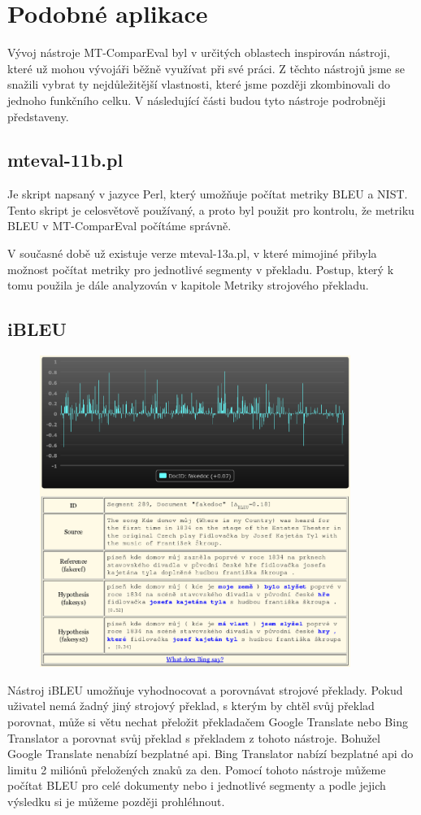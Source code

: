 \section{Podobné aplikace}
Vývoj nástroje MT-ComparEval byl v určitých oblastech inspirován nástroji,
  které už mohou vývojáři běžně využívat při své práci.
Z těchto nástrojů jsme se snažili vybrat ty nejdůležitější vlastnosti,
  které jsme později zkombinovali do jednoho funkčního celku.
V následující části budou tyto nástroje podrobněji představeny.

\subsection{mteval-11b.pl}
Je skript napsaný v jazyce Perl,
  který umožňuje počítat metriky BLEU a NIST.
Tento skript je celosvětově používaný,
  a proto byl použit pro kontrolu,
  že metriku BLEU v MT-ComparEval počítáme správně.

V současné době už existuje verze mteval-13a.pl,
  v které mimojiné přibyla možnost počítat metriky pro jednotlivé segmenty v překladu.
Postup, který k tomu použila je dále analyzován v kapitole Metriky strojového překladu.

\subsection{iBLEU}
\begin{figure}[h]
  \center
  \includegraphics[width=0.9\textwidth]{img/ibleu.eps}
\end{figure}
Nástroj iBLEU umožňuje vyhodnocovat a porovnávat strojové překlady.
Pokud uživatel nemá žadný jiný strojový překlad,
  s kterým by chtěl svůj překlad porovnat,
  může si větu nechat přeložit překladačem Google Translate nebo Bing Translator
  a porovnat svůj překlad s překladem z tohoto nástroje.
Bohužel Google Translate nenabízí bezplatné api.
Bing Translator nabízí bezplatné api do limitu 2 miliónů přeložených znaků za den.
Pomocí tohoto nástroje můžeme počítat BLEU pro celé dokumenty nebo i jednotlivé segmenty
  a podle jejich výsledku si je můžeme později prohléhnout.

